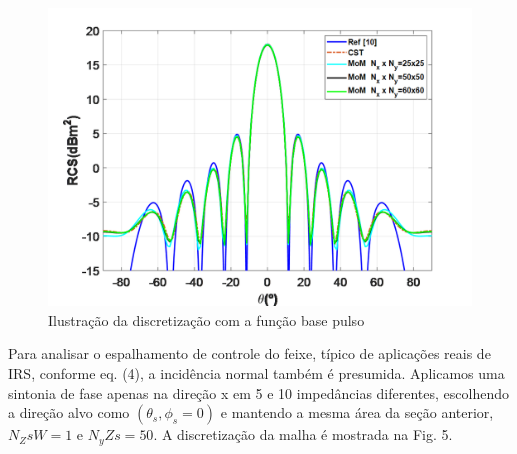 \documentclass[
	12pt,				%
	openright,			%
	oneside,			%
	a4paper,			%
	english,			%
	brazil				%
	]{abntex2}
\begin{document}
\begin{figure}[htb]
 \label{DiscretizaçãoXY}
    \centering
    \caption{Ilustração da discretização  com a função base pulso} \label{fig_minipage}
    \includegraphics[width=\textwidth]{figures/RCSMeshValidationYoz.png}
  \hfill
\end{figure}

Para analisar o espalhamento de controle do feixe, típico de aplicações reais de IRS, conforme eq. (4), a incidência normal também é presumida. Aplicamos uma sintonia de fase apenas na direção x em 5 e 10 impedâncias diferentes, escolhendo a direção alvo como $(\theta_s,\phi_s=0)$ e mantendo a mesma área da seção anterior, $N_ZsW=1$ e $N_yZs=50$. A discretização da malha é mostrada na Fig. 5. 
\end{document}
